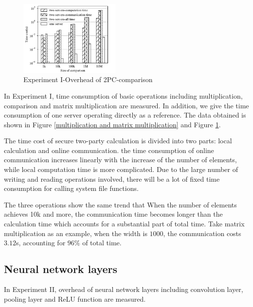 \documentclass[letterpaper]{article} %
\begin{document}
    \begin{figure}[htbp]

        \centering
        \includegraphics[width=5cm]{operation_compare.pdf}
        \caption{Experiment I-Overhead of 2PC-comparison}
        \label{operation_compare}
    \end{figure}
    In Experiment I, time consumption of basic operations including multiplication, comparison and matrix multiplication are measured.
    In addition, we give the time consumption of one server operating directly as a reference.
    The data obtained is shown in Figure \ref{multiplication and matrix multiplication} and Figure \ref{operation_compare}.

    The time cost of secure two-party calculation is divided into two parts:
    local calculation and online communication.
    the time consumption of online communication increases linearly with the increase of the number of elements,
    while local computation time is more complicated.
    Due to the large number of writing and reading operations involved,
    there will be a lot of fixed time consumption for calling system file functions.

    The three operations show the same trend that
    When the number of elements achieves 10k and more,
    the communication time becomes longer than the calculation time
    which accounts for a substantial part of total time.
    Take matrix multiplication as an example,
    when the width is $1000$, the communication costs $3.12$s, accounting for $96\%$ of total time.

    \subsection{Neural network layers}
    In Experiment II, overhead of neural network layers including
    convolution layer, pooling layer and ReLU function are measured.
\end{document}
